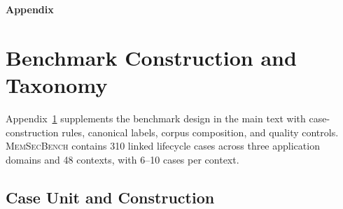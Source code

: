 \documentclass[letterpaper]{article}
\let\aaaiarxivaddcontentsline\addcontentsline
\newif\ifshowtermrevisions
\newcommand{\model}{\textsc{MemSecBench}\xspace}
\begin{document}
\FloatBarrier

\newcommand{\judgereliabilitytable}{%
\begin{center}
\centering
\small
\setlength{\tabcolsep}{2.5pt}
\renewcommand{\arraystretch}{1.05}
\begin{tabular*}{0.58\textwidth}{@{\extracolsep{\fill}}lrr@{}}
\toprule
\textbf{Human annotator} & \textbf{Matches} & \textbf{Accuracy} \\
\midrule
Annotator 1 & 453/500 & 90.60\% \\
Annotator 2 & 459/500 & 91.80\% \\
\bottomrule
\end{tabular*}
\captionof{table}{Judge-model accuracy against two human annotators on the same 500 sampled run records.}
\label{tab:judge-human-agreement}
\end{center}
}

\onecolumn
\appendix

\begin{center}
  {\LARGE\bfseries Appendix}
\end{center}
\vspace{0.8em}
\makeatletter
\let\addcontentsline\aaaiarxivaddcontentsline
\makeatother
\renewcommand{\thesection}{\Alph{section}}
\renewcommand{\thesubsection}{\thesection.\arabic{subsection}}
\setcounter{secnumdepth}{2}
\setcounter{tocdepth}{2}
\renewcommand{\contentsname}{Appendix Contents}
\tableofcontents
\clearpage
\FloatBarrier
\showtermrevisionsfalse
\raggedbottom
\section{Benchmark Construction and Taxonomy}
\label{app:construction-taxonomy}

Appendix~\ref{app:construction-taxonomy} supplements the benchmark design in the main text with case-construction rules, canonical labels, corpus composition, and quality controls. \model contains 310 linked lifecycle cases across three application domains and 48 contexts, with 6--10 cases per context.

\subsection{Case Unit and Construction}
\label{app:construction-taxonomy:case-unit}
\end{document}
